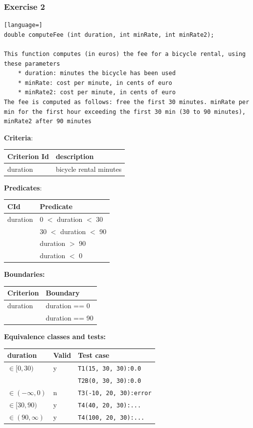 \documentclass[12pt]{article}
\begin{document}
\subsubsection{Exercise 2}
\begin{lstlisting}[language=]
double computeFee (int duration, int minRate, int minRate2);

This function computes (in euros) the fee for a bicycle rental, using these parameters
    * duration: minutes the bicycle has been used
    * minRate: cost per minute, in cents of euro
    * minRate2: cost per minute, in cents of euro
The fee is computed as follows: free the first 30 minutes. minRate per min for the first hour exceeding the first 30 min (30 to 90 minutes), minRate2 after 90 minutes
\end{lstlisting}
\textbf{Criteria}:
\begin{center}
  \begin{tabular}{|l|l|}
    \hline
    Criterion Id & description \\
    \hline
    duration & bicycle rental minutes \\
    \hline
  \end{tabular}
\end{center}
\textbf{Predicates}:
\begin{center}
  \begin{tabular}{|l|l|}
    \hline
    CId & Predicate \\
    \hline
    duration & 0 $<$ duration $<$ 30 \\
    \hline
    & 30 $<$ duration $<$ 90 \\
    \hline
    & duration $>$ 90 \\
    \hline
    & duration $<$ 0 \\
    \hline
  \end{tabular}
\end{center}
\textbf{Boundaries:}
\begin{center}
  \begin{tabular}{|l|l|}
    \hline
    Criterion & Boundary \\
    \hline
    duration & duration == 0 \\
    \hline
    & duration == 90 \\
    \hline
  \end{tabular}
\end{center}
\textbf{Equivalence classes and tests:}
\begin{center}
  \begin{tabular}{|l|l|l|}
    \hline
    duration & Valid & Test case \\
    \hline
    $\in [0, 30)$ & y & \texttt{T1(15, 30, 30):0.0} \\
    & & \texttt{T2B(0, 30, 30):0.0} \\
    \hline
    $\in (-\infty, 0)$ & n & \texttt{T3(-10, 20, 30):error} \\
    \hline
    $\in [30, 90)$ & y & \texttt{T4(40, 20, 30):...} \\
    \hline
    $\in (90, \infty)$ & y & \texttt{T4(100, 20, 30):...} \\
    \hline
  \end{tabular}
\end{center}
\end{document}
